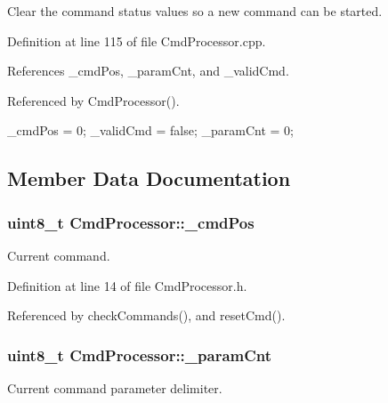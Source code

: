 Clear the command status values so a new command can be started. 



Definition at line 115 of file CmdProcessor.cpp.



References \_\-cmdPos, \_\-paramCnt, and \_\-validCmd.



Referenced by CmdProcessor().


\begin{DoxyCode}
{
    _cmdPos = 0;
    _validCmd = false;
    _paramCnt = 0;
}
\end{DoxyCode}


\subsection{Member Data Documentation}
\hypertarget{class_cmd_processor_a6201596327a378c5317c1f6a8a9d5bc4}{
\subsubsection[{\_\-cmdPos}]{\setlength{\rightskip}{0pt plus 5cm}uint8\_\-t {\bf CmdProcessor::\_\-cmdPos}}}
\label{class_cmd_processor_a6201596327a378c5317c1f6a8a9d5bc4}


Current command. 



Definition at line 14 of file CmdProcessor.h.



Referenced by checkCommands(), and resetCmd().

\hypertarget{class_cmd_processor_aff0622d6e4fca6bf1352392936d6c5ea}{
\subsubsection[{\_\-paramCnt}]{\setlength{\rightskip}{0pt plus 5cm}uint8\_\-t {\bf CmdProcessor::\_\-paramCnt}}}
\label{class_cmd_processor_aff0622d6e4fca6bf1352392936d6c5ea}


Current command parameter delimiter. 



